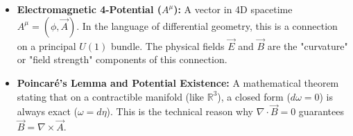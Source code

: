 \begin{solution}
\begin{itemize}
\begin{itemize}
    \end{itemize}
    \item \textbf{Electromagnetic 4-Potential ($A^\mu$):} A vector in 4D spacetime $A^\mu = (\phi, \vec{A})$. In the language of differential geometry, this is a connection on a principal $U(1)$ bundle. The physical fields $\vec{E}$ and $\vec{B}$ are the "curvature" or "field strength" components of this connection.
    \item \textbf{Poincaré's Lemma and Potential Existence:} A mathematical theorem stating that on a contractible manifold (like $\mathbb{R}^3$), a closed form ($d\omega = 0$) is always exact ($\omega = d\eta$). This is the technical reason why $\nabla \cdot \vec{B} = 0$ guarantees $\vec{B} = \nabla \times \vec{A}$.
\end{itemize}


\end{solution}
